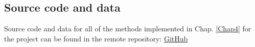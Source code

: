 \documentclass[12pt, a4paper]{report}
\begin{document}
\renewcommand{\bibname}{References}

%

\begin{appendices}
\chapter{Source code and data} \label{System Requirements}
Source code and data for all of the methods implemented in Chap. \ref{Chap4} for the project can be found in the remote repository: \href{https://github.com/rpoandres/MSc_USS_Dissertation}{GitHub}






\end{appendices}
\clearpage
\printglossaries

\end{document}
